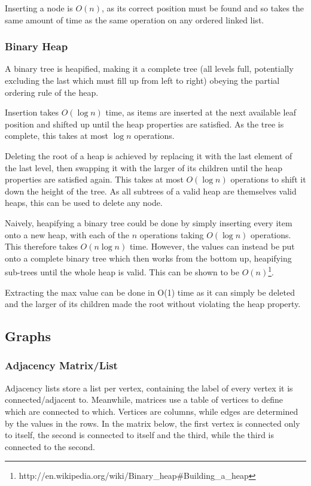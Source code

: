 \documentclass[]{article}
\begin{document}
Inserting a node is $O(n)$, as its correct position must be found and so takes the same amount of time as the same operation on any ordered linked list.

\subsubsection{Binary Heap}

A binary tree is heapified, making it a complete tree (all levels full, potentially excluding the last which must fill up from left to right) obeying the partial ordering rule of the heap.

Insertion takes $O(\log{n})$ time, as items are inserted at the next available leaf position and shifted up until the heap properties are satisfied. As the tree is complete, this takes at most $\log{n}$ operations.

Deleting the root of a heap is achieved by replacing it with the last element of the last level, then swapping it with the larger of its children until the heap properties are satisfied again. This takes at most $O(\log{n})$ operations to shift it down the height of the tree. As all subtrees of a valid heap are themselves valid heaps, this can be used to delete any node.

Naively, heapifying a binary tree could be done by simply inserting every item onto a new heap, with each of the $n$ operations taking $O(\log{n})$ operations. This therefore takes $O(n\log{n})$ time. However, the values can instead be put onto a complete binary tree which then works from the bottom up, heapifying sub-trees until the whole heap is valid. This can be shown to be $O(n)$\footnote{http://en.wikipedia.org/wiki/Binary\_heap\#Building\_a\_heap}.

Extracting the max value can be done in O(1) time as it can simply be deleted and the larger of its children made the root without violating the heap property.

\pagebreak

\subsection{Graphs}

\subsubsection{Adjacency Matrix/List}

Adjacency lists store a list per vertex, containing the label of every vertex it is connected/adjacent to. Meanwhile, matrices use a table of vertices to define which are connected to which. Vertices are columns, while edges are determined by the values in the rows. In the matrix below, the first vertex is connected only to itself, the second is connected to itself and the third, while the third is connected to the second.
\end{document}
